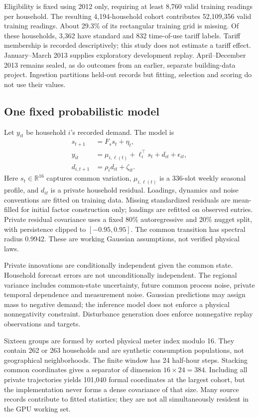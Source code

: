 \documentclass[conference]{IEEEtran}
\newcommand{\R}{\mathbb{R}}
\begin{document}
Eligibility is fixed using 2012 only, requiring at least 8,760 valid training readings per household. The resulting 4,194-household cohort contributes 52,109,356 valid training readings. About 29.3\% of its rectangular training grid is missing. Of these households, 3,362 have standard and 832 time-of-use tariff labels. Tariff membership is recorded descriptively; this study does not estimate a tariff effect. January--March 2013 supplies exploratory development replay. April--December 2013 remains sealed, as do outcomes from an earlier, separate building-data project. Ingestion partitions held-out records but fitting, selection and scoring do not use their values.

\subsection{One fixed probabilistic model}
Let $y_{it}$ be household $i$'s recorded demand. The model is
\begin{align}
 s_{t+1}&=F_s s_t+\eta_t,\\
 y_{it}&=\mu_{i,\ell(t)}+\ell_i^\top s_t+d_{it}+\epsilon_{it},\label{eq:model}\\
 d_{i,t+1}&=\rho_i d_{it}+\zeta_{it}.
\end{align}
Here $s_t\in\R^{16}$ captures common variation, $\mu_{i,\ell(t)}$ is a 336-slot weekly seasonal profile, and $d_{it}$ is a private household residual. Loadings, dynamics and noise conventions are fitted on training data. Missing standardized residuals are mean-filled for initial factor construction only; loadings are refitted on observed entries. Private residual covariance uses a fixed 80\% autoregressive and 20\% nugget split, with persistence clipped to $[-0.95,0.95]$. The common transition has spectral radius 0.9942. These are working Gaussian assumptions, not verified physical laws.

Private innovations are conditionally independent given the common state. Household forecast errors are not unconditionally independent. The regional variance includes common-state uncertainty, future common process noise, private temporal dependence and measurement noise. Gaussian predictions may assign mass to negative demand; the inference model does not enforce a physical nonnegativity constraint. Disturbance generation does enforce nonnegative replay observations and targets.

Sixteen groups are formed by sorted physical meter index modulo 16. They contain 262 or 263 households and are synthetic consumption populations, not geographical neighborhoods. The finite window has 24 half-hour steps. Stacking common coordinates gives a separator of dimension $16\times24=384$. Including all private trajectories yields 101,040 formal coordinates at the largest cohort, but the implementation never forms a dense covariance of that size. Many source records contribute to fitted statistics; they are not all simultaneously resident in the GPU working set.
\end{document}

